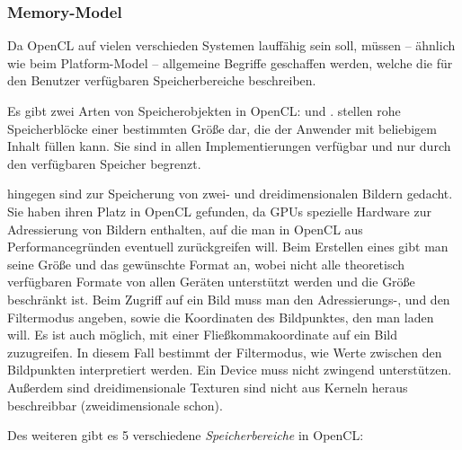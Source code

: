\subsubsection{Memory-Model}
\label{sec:opencl_memory_model}

Da OpenCL auf vielen verschieden Systemen lauffähig sein soll, müssen
-- ähnlich wie beim Platform-Model -- allgemeine Begriffe geschaffen
werden, welche die für den Benutzer verfügbaren Speicherbereiche
beschreiben.

Es gibt zwei Arten von Speicherobjekten in OpenCL:
 und
.  stellen rohe
Speicherblöcke einer bestimmten Größe dar, die der Anwender mit
beliebigem Inhalt füllen kann. Sie sind in allen Implementierungen
verfügbar und nur durch den verfügbaren Speicher begrenzt.

 hingegen sind zur Speicherung von zwei- und
dreidimensionalen Bildern gedacht. Sie haben ihren Platz in OpenCL
gefunden, da GPUs spezielle Hardware zur Adressierung von Bildern
enthalten, auf die man in OpenCL aus Performancegründen eventuell
zurückgreifen will. Beim Erstellen eines  gibt man seine
Größe und das gewünschte Format an, wobei nicht alle theoretisch
verfügbaren Formate von allen Geräten unterstützt werden und die Größe
beschränkt ist. Beim Zugriff auf ein Bild muss man den Adressierungs-,
und den Filtermodus angeben, sowie die Koordinaten des Bildpunktes,
den man laden will. Es ist auch möglich, mit einer
Fließkommakoordinate auf ein Bild zuzugreifen. In diesem Fall bestimmt
der Filtermodus, wie Werte zwischen den Bildpunkten interpretiert
werden. Ein Device muss nicht zwingend 
unterstützen. Außerdem sind dreidimensionale Texturen sind nicht aus
Kerneln heraus beschreibbar (zweidimensionale schon).

Des weiteren gibt es 5 verschiedene \emph{Speicherbereiche} in OpenCL:

